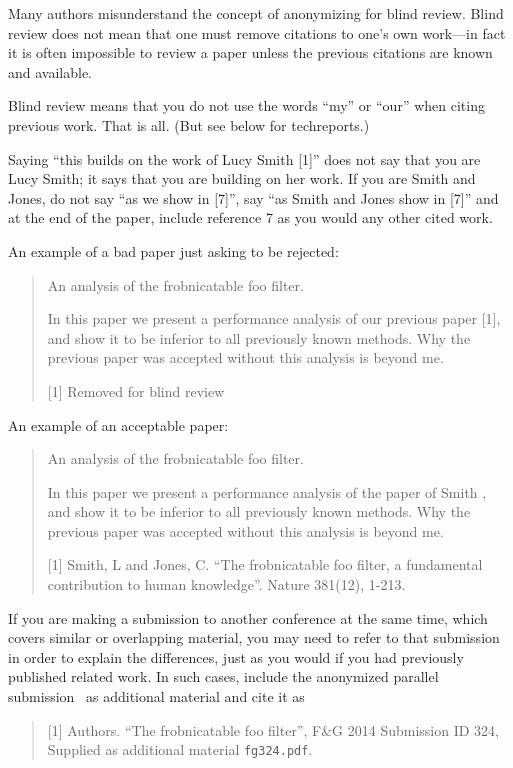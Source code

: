 \documentclass[10pt,twocolumn,letterpaper]{article}
\begin{document}
Many authors misunderstand the concept of anonymizing for blind
review.  Blind review does not mean that one must remove
citations to one's own work---in fact it is often impossible to
review a paper unless the previous citations are known and
available.

Blind review means that you do not use the words ``my'' or ``our''
when citing previous work.  That is all.  (But see below for
techreports.)

Saying ``this builds on the work of Lucy Smith [1]'' does not say
that you are Lucy Smith; it says that you are building on her
work.  If you are Smith and Jones, do not say ``as we show in
[7]'', say ``as Smith and Jones show in [7]'' and at the end of the
paper, include reference 7 as you would any other cited work.

An example of a bad paper just asking to be rejected:
\begin{quote}
\begin{center}
    An analysis of the frobnicatable foo filter.
\end{center}

   In this paper we present a performance analysis of our
   previous paper [1], and show it to be inferior to all
   previously known methods.  Why the previous paper was
   accepted without this analysis is beyond me.

   [1] Removed for blind review
\end{quote}


An example of an acceptable paper:

\begin{quote}
\begin{center}
     An analysis of the frobnicatable foo filter.
\end{center}

   In this paper we present a performance analysis of the
   paper of Smith \etal [1], and show it to be inferior to
   all previously known methods.  Why the previous paper
   was accepted without this analysis is beyond me.

   [1] Smith, L and Jones, C. ``The frobnicatable foo
   filter, a fundamental contribution to human knowledge''.
   Nature 381(12), 1-213.
\end{quote}

If you are making a submission to another conference at the same time,
which covers similar or overlapping material, you may need to refer to that
submission in order to explain the differences, just as you would if you
had previously published related work.  In such cases, include the
anonymized parallel submission~\cite{Authors14} as additional material and
cite it as
\begin{quote}
[1] Authors. ``The frobnicatable foo filter'', F\&G 2014 Submission ID 324,
Supplied as additional material {\tt fg324.pdf}.
\end{quote}
\end{document}
